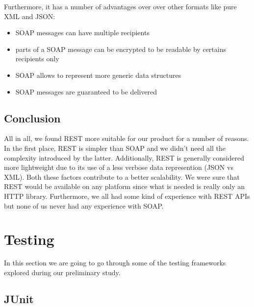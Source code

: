 Furthermore, it has a number of advantages over over other formats like pure XML and JSON:
\begin{itemize}
\item SOAP messages can have multiple recipients
\item parts of a SOAP message can be encrypted to be readable by certains recipients only
\item SOAP allows to represent more generic data structures
\item SOAP messages are guaranteed to be delivered
\end{itemize}

\subsection{Conclusion}
\label{subsec:soa-conclusion}
All in all, we found REST more suitable for our product for a number of reasons.
In the first place, REST is simpler than SOAP and we didn't need all the complexity introduced by the latter.
Additionally, REST is generally considered more lightweight due to its use of a less verbose data
represention (JSON vs XML). Both these factors contribute to a better scalability.
We were sure that REST would be available on any platform since what is needed
is really only an HTTP library. Furthermore, we all had some kind of experience with
REST APIs but none of us never had any experience with SOAP.


\section{Testing}
\label{section:testing}

In this section we are going to go through some of the testing frameworks explored during our preliminary study.

\subsection{JUnit}

